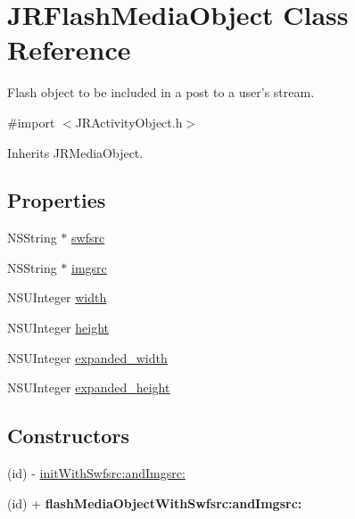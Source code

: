 \hypertarget{interface_j_r_flash_media_object}{
\section{JRFlashMediaObject Class Reference}
\label{interface_j_r_flash_media_object}
}


Flash object to be included in a post to a user's stream.  




{\ttfamily \#import $<$JRActivityObject.h$>$}



Inherits JRMediaObject.

\subsection*{Properties}
\begin{DoxyCompactItemize}
\item 
NSString $\ast$ \hyperlink{interface_j_r_flash_media_object_a5a79b3d8071ac0286b3ee60e9e0138d0}{swfsrc}
\item 
NSString $\ast$ \hyperlink{interface_j_r_flash_media_object_a5a26cacd216012b37900445a8161ac56}{imgsrc}
\item 
NSUInteger \hyperlink{interface_j_r_flash_media_object_aaeb77e697438b7aa6e44f52bea0ed9c2}{width}
\item 
NSUInteger \hyperlink{interface_j_r_flash_media_object_a0689e19fdf6cb9d3911878a95d6ebcc9}{height}
\item 
NSUInteger \hyperlink{interface_j_r_flash_media_object_a9c380d0410afa60d99442f4ab84b517c}{expanded\_\-width}
\item 
NSUInteger \hyperlink{interface_j_r_flash_media_object_ae390a89405d768f2fcc63c24a8271503}{expanded\_\-height}
\end{DoxyCompactItemize}
\subsection*{Constructors}
\label{_amgrp559a25fdb98a7d1fd1c3771ac568d5e9}
 \begin{DoxyCompactItemize}
\item 
(id) -\/ \hyperlink{interface_j_r_flash_media_object_aed4ac7b682373f36379eb81dea041513}{initWithSwfsrc:andImgsrc:}
\item 
\hypertarget{interface_j_r_flash_media_object_ab7f138fd781dd5cf40f1fc3d96b68edf}{
(id) + {\bfseries flashMediaObjectWithSwfsrc:andImgsrc:}}
\label{interface_j_r_flash_media_object_ab7f138fd781dd5cf40f1fc3d96b68edf}

\end{DoxyCompactItemize}


